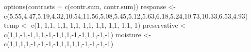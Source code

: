 \documentclass[
]{book}
\newenvironment{Shaded}{\begin{snugshade}}{\end{snugshade}}
\newcommand{\AttributeTok}[1]{\textcolor[rgb]{0.77,0.63,0.00}{#1}}
\newcommand{\DecValTok}[1]{\textcolor[rgb]{0.00,0.00,0.81}{#1}}
\newcommand{\FloatTok}[1]{\textcolor[rgb]{0.00,0.00,0.81}{#1}}
\newcommand{\FunctionTok}[1]{\textcolor[rgb]{0.00,0.00,0.00}{#1}}
\newcommand{\NormalTok}[1]{#1}
\newcommand{\OtherTok}[1]{\textcolor[rgb]{0.56,0.35,0.01}{#1}}
\newcommand{\SpecialCharTok}[1]{\textcolor[rgb]{0.00,0.00,0.00}{#1}}
\newcommand{\StringTok}[1]{\textcolor[rgb]{0.31,0.60,0.02}{#1}}
\begin{document}
\begin{Shaded}
\begin{Highlighting}[]
\FunctionTok{options}\NormalTok{(}\AttributeTok{contrasts =} \FunctionTok{c}\NormalTok{(}\StringTok{\textquotesingle{}contr.sum\textquotesingle{}}\NormalTok{, }\StringTok{\textquotesingle{}contr.sum\textquotesingle{}}\NormalTok{))}
\NormalTok{response }\OtherTok{\textless{}{-}} \FunctionTok{c}\NormalTok{(}\FloatTok{5.55}\NormalTok{,}\FloatTok{4.47}\NormalTok{,}\FloatTok{5.19}\NormalTok{,}\FloatTok{4.32}\NormalTok{,}\FloatTok{10.54}\NormalTok{,}\FloatTok{11.56}\NormalTok{,}\FloatTok{5.08}\NormalTok{,}\FloatTok{5.45}\NormalTok{,}\FloatTok{5.12}\NormalTok{,}\FloatTok{5.63}\NormalTok{,}\FloatTok{6.18}\NormalTok{,}\FloatTok{5.24}\NormalTok{,}\FloatTok{10.73}\NormalTok{,}\FloatTok{10.33}\NormalTok{,}\FloatTok{6.53}\NormalTok{,}\FloatTok{4.93}\NormalTok{)}
\NormalTok{temp }\OtherTok{\textless{}{-}} \FunctionTok{c}\NormalTok{(}\DecValTok{1}\NormalTok{,}\SpecialCharTok{{-}}\DecValTok{1}\NormalTok{,}\DecValTok{1}\NormalTok{,}\SpecialCharTok{{-}}\DecValTok{1}\NormalTok{,}\DecValTok{1}\NormalTok{,}\SpecialCharTok{{-}}\DecValTok{1}\NormalTok{,}\DecValTok{1}\NormalTok{,}\SpecialCharTok{{-}}\DecValTok{1}\NormalTok{,}\DecValTok{1}\NormalTok{,}\SpecialCharTok{{-}}\DecValTok{1}\NormalTok{,}\DecValTok{1}\NormalTok{,}\SpecialCharTok{{-}}\DecValTok{1}\NormalTok{,}\DecValTok{1}\NormalTok{,}\SpecialCharTok{{-}}\DecValTok{1}\NormalTok{,}\DecValTok{1}\NormalTok{,}\SpecialCharTok{{-}}\DecValTok{1}\NormalTok{)}
\NormalTok{preservative }\OtherTok{\textless{}{-}} \FunctionTok{c}\NormalTok{(}\DecValTok{1}\NormalTok{,}\DecValTok{1}\NormalTok{,}\SpecialCharTok{{-}}\DecValTok{1}\NormalTok{,}\SpecialCharTok{{-}}\DecValTok{1}\NormalTok{,}\DecValTok{1}\NormalTok{,}\DecValTok{1}\NormalTok{,}\SpecialCharTok{{-}}\DecValTok{1}\NormalTok{,}\SpecialCharTok{{-}}\DecValTok{1}\NormalTok{,}\DecValTok{1}\NormalTok{,}\DecValTok{1}\NormalTok{,}\SpecialCharTok{{-}}\DecValTok{1}\NormalTok{,}\SpecialCharTok{{-}}\DecValTok{1}\NormalTok{,}\DecValTok{1}\NormalTok{,}\DecValTok{1}\NormalTok{,}\SpecialCharTok{{-}}\DecValTok{1}\NormalTok{,}\SpecialCharTok{{-}}\DecValTok{1}\NormalTok{)}
\NormalTok{moisture }\OtherTok{\textless{}{-}} \FunctionTok{c}\NormalTok{(}\DecValTok{1}\NormalTok{,}\DecValTok{1}\NormalTok{,}\DecValTok{1}\NormalTok{,}\DecValTok{1}\NormalTok{,}\SpecialCharTok{{-}}\DecValTok{1}\NormalTok{,}\SpecialCharTok{{-}}\DecValTok{1}\NormalTok{,}\SpecialCharTok{{-}}\DecValTok{1}\NormalTok{,}\SpecialCharTok{{-}}\DecValTok{1}\NormalTok{,}\DecValTok{1}\NormalTok{,}\DecValTok{1}\NormalTok{,}\DecValTok{1}\NormalTok{,}\DecValTok{1}\NormalTok{,}\SpecialCharTok{{-}}\DecValTok{1}\NormalTok{,}\SpecialCharTok{{-}}\DecValTok{1}\NormalTok{,}\SpecialCharTok{{-}}\DecValTok{1}\NormalTok{,}\SpecialCharTok{{-}}\DecValTok{1}\NormalTok{)}

\end{Highlighting}
\end{Shaded}
\end{document}
